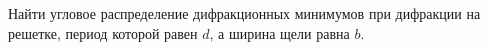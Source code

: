 \documentclass[__main__.tex]{subfiles}
\begin{document}
Найти угловое распределение дифракционных минимумов при дифракции на решетке, период которой равен $d$, а ширина щели равна $b$.\\ 

\end{document}
